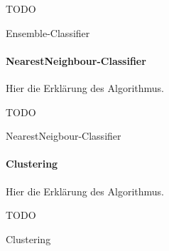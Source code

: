 \begin{algorithm}[H]
	\vspace{0.2cm}
	TODO
	\caption{Ensemble-Classifier}
	\label{alg:ensemble}
	\vspace{0.2cm}
\end{algorithm}

\paragraph{NearestNeighbour-Classifier}
Hier die Erklärung des Algorithmus.

\begin{algorithm}[H]
	\vspace{0.2cm}
	TODO
	\caption{NearestNeigbour-Classifier}
	\label{alg:nearest_neighbour}
	\vspace{0.2cm}
\end{algorithm}

\paragraph{Clustering}
Hier die Erklärung des Algorithmus.

\begin{algorithm}[H]
	\vspace{0.2cm}
	TODO
	\caption{Clustering}
	\label{alg:cluster}
	\vspace{0.2cm}
\end{algorithm}






